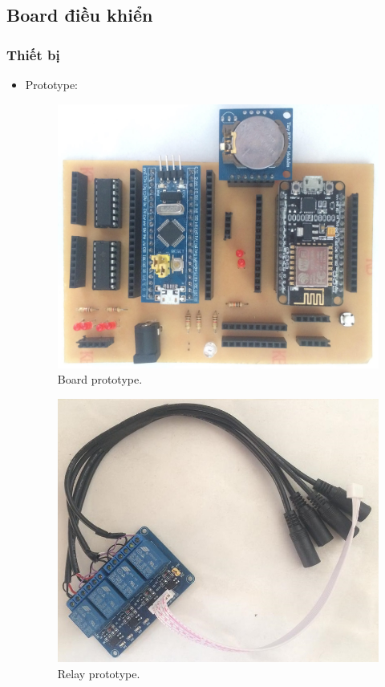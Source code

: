 \documentclass[a4paper,12pt,oneside]{article}
\begin{document}
\subsection{Board điều khiển}
\subsubsection{Thiết bị}

\begin{itemize}
\item Prototype:
	\begin{figure}[H]
	\centering
	\includegraphics[scale=.15]{hinh/prototype_board.jpg}
	\caption{Board prototype.}
	\end{figure}
	
	\begin{figure}[H]
	\centering
	\includegraphics[scale=.5]{hinh/relay_prototype.jpg}
	\caption{Relay prototype.}
	\end{figure}
	

\end{itemize}
\end{document}
